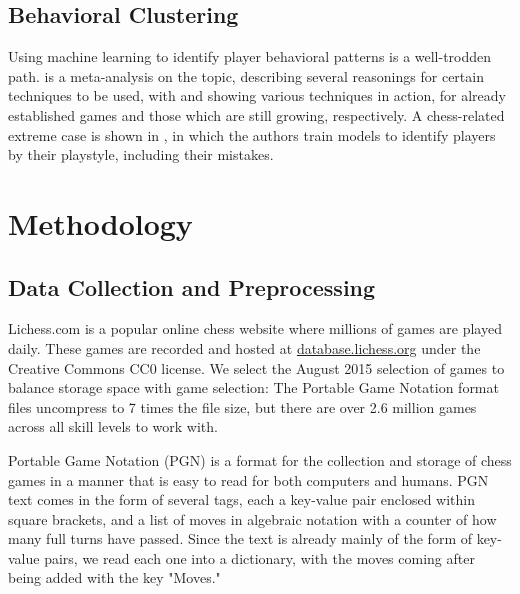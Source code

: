 \documentclass[conference]{IEEEtran}
\begin{document}
\subsection{Behavioral Clustering}
Using machine learning to identify player behavioral patterns is a well-trodden path. \cite{b3} is a meta-analysis on the topic, describing several reasonings for certain techniques to be used, with \cite{b7} and \cite{b8} showing various techniques in action, for already established games and those which are still growing, respectively. A chess-related extreme case is shown in \cite{b10}, in which the authors train models to identify players by their playstyle, including their mistakes.


\section{Methodology}
\subsection{Data Collection and Preprocessing}
Lichess.com is a popular online chess website where millions of games are played daily. These games are recorded and hosted at \href{https://database.lichess.org/}{database.lichess.org} under the Creative Commons CC0 license. We select the August 2015 selection of games to balance storage space with game selection: The Portable Game Notation format files uncompress to 7 times the file size, but there are over 2.6 million games across all skill levels to work with.

Portable Game Notation (PGN) is a format for the collection and storage of chess games in a manner that is easy to read for both computers and humans. \cite{b9} PGN text comes in the form of several tags, each a key-value pair enclosed within square brackets, and a list of moves in algebraic notation with a counter of how many full turns have passed. Since the text is already mainly of the form of key-value pairs, we read each one into a dictionary, with the moves coming after being added with the key "Moves."

%
\end{document}
